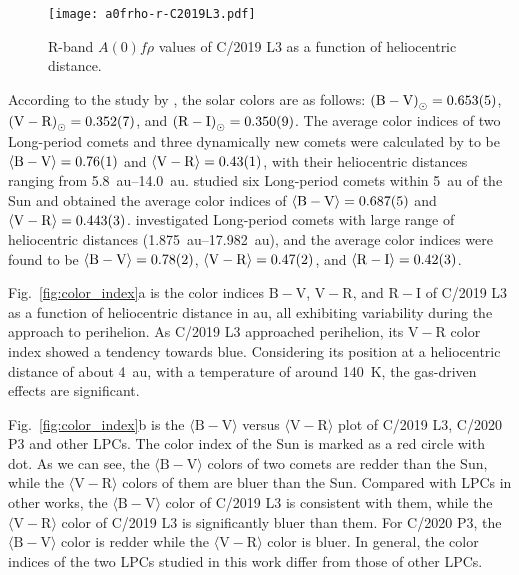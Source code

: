 \begin{figure}
    \centering
    \texttt{[image: a0frho-r-C2019L3.pdf]}
    \caption{R-band $A(0)f\rho$ values of C/2019 L3 as a function of heliocentric distance. }\label{fig:a0frho-c2019}
\end{figure}

According to the study by \cite{ramirez_ubvric_2012}, the solar colors are as follows: 
${(\mathrm{B} - \mathrm{V})}_{\odot} = \num{0.653 +- 0.005}$, 
${(\mathrm{V} - \mathrm{R})}_{\odot} = \num{0.352 +- 0.007}$, and 
${(\mathrm{R} - \mathrm{I})}_{\odot} = \num{0.350 +- 0.009}$. 
The average color indices of two Long-period comets and three dynamically new comets were calculated by \cite{meech_activity_2009} to be 
$\langle \mathrm{B} - \mathrm{V} \rangle = \num{0.76 +- 0.01}$ and 
$\langle \mathrm{V} - \mathrm{R} \rangle = \num{0.43 +- 0.01}$, 
with their heliocentric distances ranging from \SIrange{5.8}{14.0}{\astronomicalunit}. 
\cite{solontoi_ensemble_2012} studied six Long-period comets within \SI{5}{\astronomicalunit} of the Sun and obtained the average color indices of 
$\langle \mathrm{B} - \mathrm{V} \rangle = \num{0.687 +- 0.005}$ and 
$\langle \mathrm{V} - \mathrm{R} \rangle = \num{0.443 +- 0.003}$. 
\cite{jewittCOLORSYSTEMATICSCOMETS2015} investigated Long-period comets with large range of heliocentric distances (\SIrange{1.875}{17.982}{\astronomicalunit}), and the average color indices were found to be 
$\langle \mathrm{B} - \mathrm{V} \rangle = \num{0.78 +- 0.02}$, 
$\langle \mathrm{V} - \mathrm{R} \rangle = \num{0.47 +- 0.02}$, and 
$\langle \mathrm{R} - \mathrm{I} \rangle = \num{0.42 +- 0.03}$. 

Fig.~\ref{fig:color_index}a is the color indices $\mathrm{B}-\mathrm{V}$, $\mathrm{V}-\mathrm{R}$, and $\mathrm{R}-\mathrm{I}$ of C/2019 L3 as a function of heliocentric distance in \si{\astronomicalunit}, all exhibiting variability during the approach to perihelion. 
As C/2019 L3 approached perihelion, its $\mathrm{V}-\mathrm{R}$ color index showed a tendency towards blue. 
Considering its position at a heliocentric distance of about {\SI{4}{\astronomicalunit}}, with a temperature of around {\SI{140}{\K}}, the gas-driven effects are significant. 

Fig.~\ref{fig:color_index}b is the $\langle \mathrm{B}-\mathrm{V} \rangle$ versus $\langle \mathrm{V}-\mathrm{R} \rangle$ plot of C/2019 L3, C/2020 P3 and other LPCs. 
The color index of the Sun \citep{ramirez_ubvric_2012} is marked as a red circle with dot. 
As we can see, the $\langle \mathrm{B} - \mathrm{V} \rangle$ colors of two comets are redder than the Sun, while the $\langle \mathrm{V} - \mathrm{R} \rangle$ colors of them are bluer than the Sun. 
Compared with LPCs in other works, the $\langle \mathrm{B} - \mathrm{V} \rangle$ color of C/2019 L3 is consistent with them, while the $\langle \mathrm{V} - \mathrm{R} \rangle$ color of C/2019 L3 is significantly bluer than them. For C/2020 P3, the $\langle \mathrm{B} - \mathrm{V} \rangle$ color is redder while the $\langle \mathrm{V} - \mathrm{R} \rangle$ color is bluer. 
In general, the color indices of the two LPCs studied in this work differ from those of other LPCs. 

